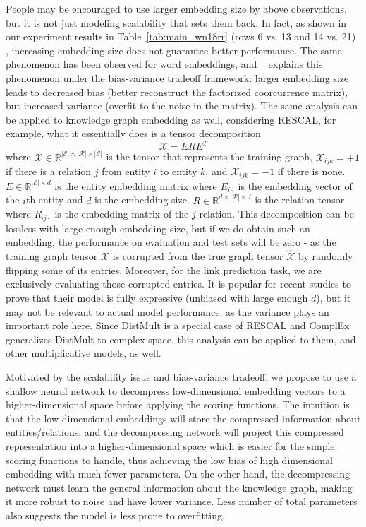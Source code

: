 \documentclass[letterpaper]{article} \usepackage{aaai20}  \usepackage{times}  \usepackage{helvet} \usepackage{courier}  \usepackage{booktabs}
\begin{document}
People may be encouraged to use larger embedding size by above observations, but it is not just modeling scalability that sets them back. In fact, as shown in our experiment results in Table~\ref{tab:main_wn18rr} (rows 6 vs. 13 and 14 vs. 21) , increasing embedding size does not guarantee better performance. The same phenomenon has been observed for word embeddings, and \citeauthor{yin2018dimensionality}~ explains this phenomenon under the bias-variance tradeoff framework: larger embedding size leads to decreased bias (better reconstruct the factorized coorcurrence matrix), but increased variance (overfit to the noise in the matrix). The same analysis can be applied to knowledge graph embedding as well,
considering RESCAL, for example, what it essentially does is a tensor decomposition
$$ \mathcal{X} = ERE^T $$
where $\mathcal{X} \in \mathbb{R}^{|\mathcal{E}|\times|\mathcal{R}|\times|\mathcal{E}|}$ is the tensor that represents the training graph, $\mathcal{X}_{ijk} = +1$ if there is a relation $j$ from entity $i$ to entity $k$, and $\mathcal{X}_{ijk} = -1$ if there is none. $E \in \mathbb{R}^{|\mathcal{E}|\times d}$ is the entity embedding matrix where $E_{i\cdot}$ is the embedding vector of the $i$th entity and $d$ is the embedding size. $R \in \mathbb{R}^{d \times |\mathcal{R}|\times d}$ is the relation tensor where $R_{\cdot j\cdot}$ is the embedding matrix of the $j$ relation.
This decomposition can be lossless with large enough embedding size, but if we do obtain such an embedding, the performance on evaluation and test sets will be zero - as the training graph tensor $\mathcal{X}$ is corrupted from the true graph tensor $\hat{\mathcal{X}}$ by randomly flipping some of its entries. Moreover, for the link prediction task, we are exclusively evaluating those corrupted entries. It is popular for recent studies to prove that their model is fully expressive (unbiased with large enough $d$), but it may not be relevant to actual model performance, as the variance plays an important role here. Since DistMult is a special case of RESCAL and ComplEx generalizes DistMult to complex space, this analysis can be applied to them, and other multiplicative models, as well.

Motivated by the scalability issue and bias-variance tradeoff, we propose to use a shallow neural network to decompress low-dimensional embedding vectors to a higher-dimensional space before applying the scoring functions. The intuition is that the low-dimensional embeddings will store the compressed information about entities/relations, and the decompressing network will project this compressed representation into a higher-dimensional space which is easier for the simple scoring functions to handle, thus achieving the low bias of high dimensional embedding with much fewer parameters. On the other hand, the decompressing network must learn the general information about the knowledge graph, making it more robust to noise and have lower variance. Less number of total parameters also suggests the model is less prone to overfitting. 
\end{document}
